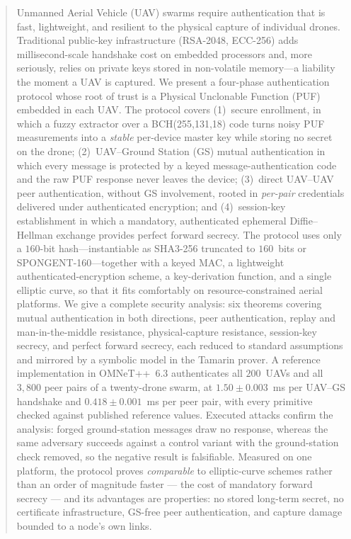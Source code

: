 \documentclass[11pt,a4paper]{article}
\begin{document}
\setcounter{page}{1}
\begin{abstract}
\noindent
Unmanned Aerial Vehicle (UAV) swarms require authentication that is fast,
lightweight, and resilient to the physical capture of individual drones.
Traditional public-key infrastructure (RSA-2048, ECC-256) adds
millisecond-scale handshake cost on embedded processors and, more seriously,
relies on private keys stored in non-volatile memory---a liability the moment
a UAV is captured. We present a four-phase authentication protocol whose root
of trust is a Physical Unclonable Function (PUF) embedded in each UAV. The
protocol covers (1)~secure enrollment, in which a fuzzy extractor over a
BCH(255,131,18) code turns noisy PUF measurements into a \emph{stable}
per-device master key while storing no secret on the drone; (2)~UAV--Ground
Station (GS) mutual authentication in which every message is protected by a
keyed message-authentication code and the raw PUF response never leaves the
device; (3)~direct UAV--UAV peer authentication, without GS involvement,
rooted in \emph{per-pair} credentials delivered under authenticated
encryption; and (4)~session-key establishment in which a mandatory,
authenticated ephemeral Diffie--Hellman exchange provides perfect forward
secrecy. The protocol uses only a $160$-bit hash---instantiable as SHA3-256
truncated to $160$~bits or SPONGENT-160---together with a keyed MAC, a
lightweight authenticated-encryption scheme, a key-derivation function, and a
single elliptic curve, so that it fits comfortably on resource-constrained
aerial platforms. We give a complete security analysis: six theorems
covering mutual authentication in both directions, peer authentication, replay
and man-in-the-middle resistance, physical-capture resistance, session-key
secrecy, and perfect forward secrecy, each reduced to standard assumptions and
mirrored by a symbolic model in the Tamarin prover. A reference implementation in
OMNeT++~6.3 authenticates all $200$~UAVs and all $3{,}800$ peer pairs of a
twenty-drone swarm, at $1.50 \pm 0.003$~ms per UAV--GS handshake and
$0.418 \pm 0.001$~ms per peer pair, with every primitive checked against published
reference values. Executed attacks confirm the analysis: forged ground-station
messages draw no response, whereas the same adversary succeeds against a control
variant with the ground-station check removed, so the negative result is
falsifiable. Measured on one platform, the protocol proves \emph{comparable} to
elliptic-curve schemes rather than an order of magnitude faster --- the cost of
mandatory forward secrecy --- and its advantages are properties: no stored
long-term secret, no certificate infrastructure, GS-free peer authentication, and
capture damage bounded to a node's own links.
\end{abstract}
\end{document}
